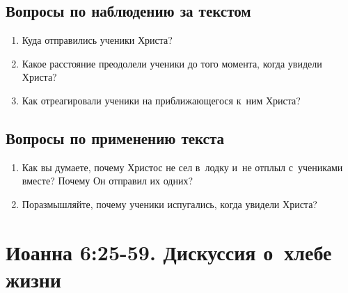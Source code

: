 \documentclass[a4paper,12pt]{article}
\begin{document}
\subsection*{Вопросы по наблюдению за текстом}
\begin{enumerate}
    \item Куда отправились ученики Христа? 
    
    \myline
    \item Какое расстояние преодолели ученики до того момента, когда увидели Христа? 
    
    \myline
    
    \item Как отреагировали ученики на приближающегося к~ним Христа? 
    
    \myline
\end{enumerate}

\subsection*{Вопросы по применению текста} 
\begin{enumerate}
    \item Как вы думаете, почему Христос не сел в~лодку и~не отплыл с~учениками вместе? Почему Он отправил их одних? 
    
    \myline
    
    \myline
    \item Поразмышляйте, почему ученики испугались, когда увидели Христа? 
    
    \myline
    
    \myline
\end{enumerate}



\section{Иоанна 6:25-59. Дискуссия о~хлебе жизни}
\end{document}
